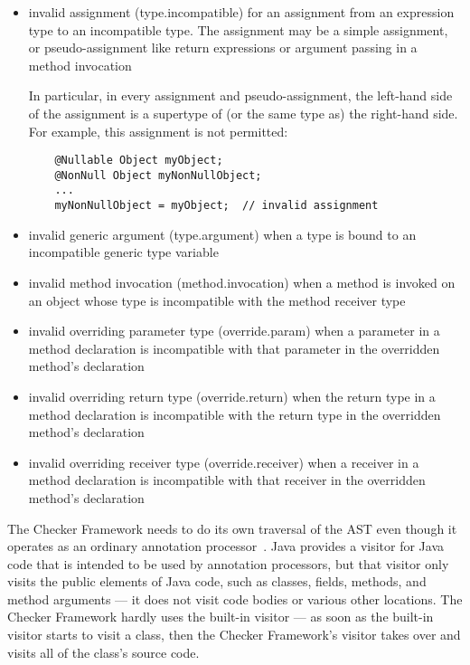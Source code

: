 \begin{itemize}

\item invalid assignment (type.incompatible) for an assignment from
  an expression type to an incompatible type.  The assignment may be a
  simple assignment, or pseudo-assignment like return expressions or
  argument passing in a method invocation

  In particular, in every assignment and pseudo-assignment, the
  left-hand side of the assignment is a supertype of (or the same type
  as) the right-hand side.  For example, this assignment is not
  permitted:

  \begin{Verbatim}
    @Nullable Object myObject;
    @NonNull Object myNonNullObject;
    ...
    myNonNullObject = myObject;  // invalid assignment
  \end{Verbatim}

\item invalid generic argument (type.argument) when a type
  is bound to an incompatible generic type variable

\item invalid method invocation (method.invocation) when a
  method is invoked on an object whose type is incompatible with the
  method receiver type

\item invalid overriding parameter type (override.param)
  when a parameter in a method declaration is incompatible with that
  parameter in the overridden method's declaration

\item invalid overriding return type (override.return) when the
  return type in a method declaration is incompatible with the
  return type in the overridden method's declaration

\item invalid overriding receiver type (override.receiver)
  when a receiver in a method declaration is incompatible with that
  receiver in the overridden method's declaration

\end{itemize}



The Checker Framework needs to do its own traversal of the AST even though
it operates as an ordinary annotation processor~\cite{JSR269}.  Java
provides a visitor for Java code that is intended to be used by annotation
processors, but that visitor only
visits the public elements of Java code, such as classes, fields, methods,
and method arguments --- it does not visit code bodies or various other
locations.  The Checker Framework hardly uses the built-in visitor --- as
soon as the built-in visitor starts to visit a class, then the Checker
Framework's visitor takes over and visits all of the class's source code.


